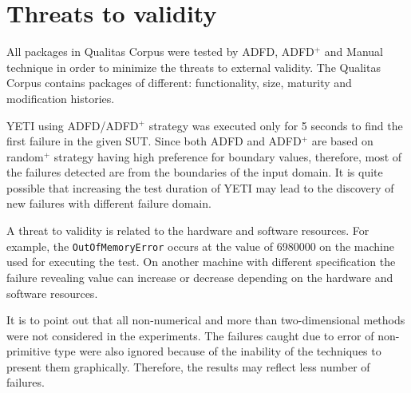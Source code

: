 \documentclass[runningheads,a4paper]{llncs}
\begin{document}



\section{Threats to validity} \label{sec:threat}
All packages in Qualitas Corpus were tested by ADFD, ADFD$^+$ and Manual technique in order to minimize the threats to external validity. The Qualitas Corpus contains packages of different: functionality, size, maturity and modification histories.

YETI using ADFD/ADFD$^+$ strategy was executed only for 5 seconds to find the first failure in the given SUT. Since both ADFD and ADFD$^+$ are based on random$^+$ strategy having high preference for boundary values, therefore, most of the failures detected are from the boundaries of the input domain. It is quite possible that increasing the test duration of YETI may lead to the discovery of new failures with different failure domain.

A threat to validity is related to the hardware and software resources. For example, the \verb+OutOfMemoryError+ occurs at the value of 6980000 on the machine used for executing the test. On another machine with different specification the failure revealing value can increase or decrease depending on the hardware and software resources.

It is to point out that all non-numerical and more than two-dimensional methods were not considered in the experiments. The failures caught due to error of non-primitive type were also ignored because of the inability of the techniques to present them graphically. Therefore, the results may reflect less number of failures.



\end{document}
